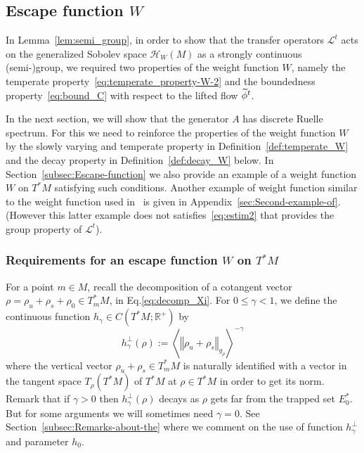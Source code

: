 \documentclass[AHL,Unicode,longabstracts,published]{cedram}
\newcommand{\clH}{\mathcal{H}}
\newcommand{\clL}{\mathcal{L}}
\newcommand{\bbR}{\mathbb{R}}
\let\oldtilde\tilde
\renewcommand*{\tilde}[1]{\mathchoice{\widetilde{#1}}{\widetilde{#1}}{\oldtilde{#1}}{\oldtilde{#1}}}
\newcommand{\clH}{\mathcal{H}}
\newcommand{\bbR}{\mathbb{R}}
\begin{document}
\subsection{Escape function \texorpdfstring{$W$}{W}}
\label{subsec:Escape-function-}
In Lemma~\ref{lem:semi_group}, in order to show that the transfer operators $\clL^{t}$ acts on the generalized Sobolev space $\clH _{W}(M)$ as a strongly continuous (semi-)group, we required two properties of the weight function $W$, namely the temperate property~\eqref{eq:temperate_property-W-2} and the boundedness property~\eqref{eq:bound_C} with respect to the lifted flow $\tilde{\phi}^{t}$.

In the next section, we will show that the generator $A$ has discrete Ruelle spectrum. For this we need to reinforce the properties of the weight function $W$ by the slowly varying and temperate property in Definition~\ref{def:temperate_W} and the decay property in Definition~\ref{def:decay_W} below. In Section~\ref{subsec:Escape-function} we also provide an example of a weight function $W$ on $T^{*}M$ satisfying such conditions. Another example of weight function similar to the weight function used in~\cite{fred-roy-sjostrand-07,fred_flow_09} is given in Appendix~\ref{sec:Second-example-of}. (However this latter example does not satisfies~\eqref{eq:estim2} that provides the group property of $\clL^{t}$).

\subsubsection{Requirements for an escape function \texorpdfstring{$W$}{W} on \texorpdfstring{$T^{*}M$}{T*M}}

For a point $m\in M$, recall the decomposition of a cotangent vector $\rho=\rho_{u}+\rho_{s}+\rho_{0}\in T_{m}^{*}M$, in Eq.\eqref{eq:decomp_Xi}. For $0\leq\gamma<1$, we define the continuous function $h_{\gamma}\in C(T^{*}M;\bbR^{+})$ by
\begin{equation}\label{eq:h_gamma}
h_{\gamma}^{\perp}\left(\rho\right):=\left\langle \left\Vert \rho_{u}+\rho_{s}\right\Vert _{g_{\rho}}\right\rangle ^{-\gamma}
\end{equation}
where the vertical vector $\rho_{u}+\rho_{s}\in T_{m}^{*}M$ is naturally identified with a vector in the tangent space $T_{\rho}(T^{*}M)$ of $T^{*}M$ at $\rho\in T^{*}M$ in order to get its norm. Remark that if $\gamma>0$ then $h_{\gamma}^{\perp}(\rho)$ decays as $\rho$ gets far from the trapped set $E_{0}^{*}$. But for some arguments we will sometimes need $\gamma=0$. See Section~\ref{subsec:Remarks-about-the} where we comment on the use of function $h_{\gamma}^{\perp}$ and parameter $h_{0}$.
\end{document}
